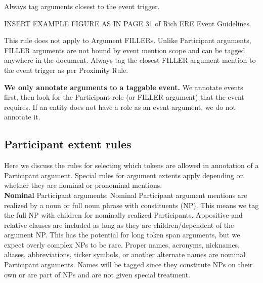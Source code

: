 Always tag arguments closest to the event trigger.

INSERT EXAMPLE FIGURE AS IN PAGE 31 of Rich ERE Event Guidelines.

This rule does not apply to Argument FILLERs.
Unlike Participant arguments, FILLER arguments are not bound by event mention scope and can be tagged anywhere in the document.
Always tag the closest FILLER argument mention to the event trigger as per Proximity Rule.

\noindent\textbf{We only annotate arguments to a taggable event.}
We annotate events first, then look for the Participant role (or FILLER argument) that the event requires. 
If an entity does not have a role as an event argument, we do not annotate it.\\

\subsection{Participant extent rules}
Here we discuss the rules for selecting which tokens are allowed in annotation of a Participant argument.
Special rules for argument extents apply depending on whether they are nominal or pronominal mentions.\\

\noindent\textbf{Nominal} Participant arguments:
Nominal Participant argument mentions are realized by a noun or full noun phrase with constituents (NP).
This means we tag the full NP with children for nominally realized Participants.
Appositive and relative clauses are included as long as they are children/dependent of the argument NP.
This has the potential for long token span arguments, but we expect overly complex NPs to be rare.
Proper names, acronyms, nicknames, aliases, abbreviations, ticker symbols, or another alternate names are nominal Participant arguments.
Names will be tagged since they constitute NPs on their own or are part of NPs and are not given special treatment.

